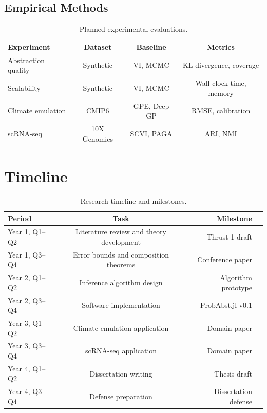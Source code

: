 \documentclass[
    language=english,
    doctype=dissertation-proposal,
    institution=none,
]{../../omnilatex}
\begin{document}
\subsection{Empirical Methods}

\begin{table}[htbp]
    \centering
    \caption{Planned experimental evaluations.}
    \label{tab:experiments}
    \begin{tabular}{@{}lccc@{}}
        \toprule
        Experiment & Dataset & Baseline & Metrics \\
        \midrule
        Abstraction quality & Synthetic & VI, MCMC & KL divergence, coverage \\
        Scalability & Synthetic & VI, MCMC & Wall-clock time, memory \\
        Climate emulation & CMIP6 & GPE, Deep GP & RMSE, calibration \\
        scRNA-seq & 10X Genomics & SCVI, PAGA & ARI, NMI \\
        \bottomrule
    \end{tabular}
\end{table}

\section{Timeline}
\label{sec:timeline}

\begin{table}[htbp]
    \centering
    \caption{Research timeline and milestones.}
    \label{tab:timeline}
    \begin{tabular}{@{}lcd{12}l@{}}
        \toprule
        Period & Task & {Milestone} \\
        \midrule
        Year 1, Q1--Q2 & Literature review and theory development & Thrust 1 draft \\
        Year 1, Q3--Q4 & Error bounds and composition theorems & Conference paper \\
        Year 2, Q1--Q2 & Inference algorithm design & Algorithm prototype \\
        Year 2, Q3--Q4 & Software implementation & ProbAbst.jl v0.1 \\
        Year 3, Q1--Q2 & Climate emulation application & Domain paper \\
        Year 3, Q3--Q4 & scRNA-seq application & Domain paper \\
        Year 4, Q1--Q2 & Dissertation writing & Thesis draft \\
        Year 4, Q3--Q4 & Defense preparation & Dissertation defense \\
        \bottomrule
    \end{tabular}
\end{table}
\end{document}
